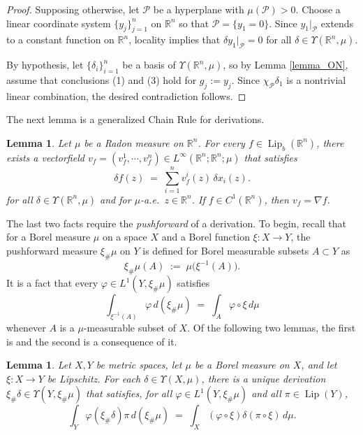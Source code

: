 \documentclass[reqno]{amsart}
\theoremstyle{plain}
\newtheorem{lemma}[thm]{Lemma}
\theoremstyle{definition}
\theoremstyle{remark}
\numberwithin{equation}{section}
\renewcommand{\d}{\delta}
\newcommand{\Lip}{\operatorname{Lip}}
\newcommand{\R}{\mathbb{R}}
\newcommand{\U}{\Upsilon}
\begin{document}
\begin{proof}
Supposing otherwise, let $\mathcal{P}$ be a hyperplane with $\mu(\mathcal{P}) > 0$.  Choose a linear coordinate system $\{y_j\}_{j=1}^n$ on $\R^n$ so that $\mathcal{P} = \{ y_1 = 0 \}$.  Since %
$y_1|_\mathcal{P}$ extends to a constant function on $\R^n$, locality implies that $\d y_1|_\mathcal{P} = 0$ for all $\d \in \U(\R^n,\mu)$.  

By hypothesis, let $\{\d_i\}_{i=1}^n$ be a basis of $\U(\R^n,\mu)$, so by Lemma \ref{lemma_ON}, assume that conclusions (1) and (3) hold for $g_j := y_j$.  Since $\chi_{\mathcal{P}}\d_1$ is a nontrivial linear combination, the desired contradiction follows.
\end{proof}

The next lemma \cite[Lem 2.20]{Gong_rigid} is a generalized Chain Rule for derivations.

\begin{lemma} \label{lemma_chainrule}
Let $\mu$ be a Radon measure on $\R^n$.
For every $f \in \Lip_b(\R^n)$, there exists a vectorfield $v_f = (v_f^1, \cdots, v_f^n) \in L^\infty(\R^n;\R^n;\mu)$ that satisfies
$$
\d f(z) \;=\; \sum_{i=1}^n v_f^i(z) \, \d x_i(z).
$$
for all $\d \in \U(\R^n,\mu)$ and for $\mu$-a.e.\ $z \in \R^n$.  If $f \in C^1(\R^n)$, then $v_f = \nabla f$.
\end{lemma}

The last two facts require the {\em pushforward} of a derivation.  To begin, recall that for a Borel measure $\mu$ on a space $X$ and a Borel function $\xi : X \to Y$, the pushforward measure $\xi_\#\mu$ on $Y$ is defined for Borel measurable subsets $A \subset Y$ as
$$
\xi_\#\mu(A) \;:=\; \mu\big( \xi^{-1}(A) \big).
$$
It is a fact \cite[Thm 1.19]{Mattila} that every $\varphi \in L^1(Y,\xi_\#\mu)$ satisfies
\begin{equation} \label{eq_pushfwd}
\int_{\xi^{-1}(A)} \varphi \, d(\xi_\#\mu) \;=\; \int_A \varphi \circ \xi \, d\mu
\end{equation}
whenever $A$ is a $\mu$-measurable subset of $X$. 
Of the following two lemmas, the first is \cite[Lem 2.17]{Gong} and the second is a consequence of it.

\begin{lemma} \label{lemma_pushfwd}
Let $X,Y$ be metric spaces, let $\mu$ be a Borel measure on $X$, and let $\xi : X \to Y$ be Lipschitz.
For each $\d \in \U(X,\mu)$, there is a unique derivation $\xi_\#\d \in \U(Y,\xi_\#\mu)$ that satisfies, for all $\varphi \in L^1(Y,\xi_\#\mu)$ and all $\pi \in \Lip(Y)$,
$$
\int_Y \varphi (\xi_\#\d)\pi \, d(\xi_\#\mu) \;=\;
\int_X (\varphi \circ \xi) \d(\pi \circ \xi) \, d\mu.
$$
\end{lemma}
\end{document}
